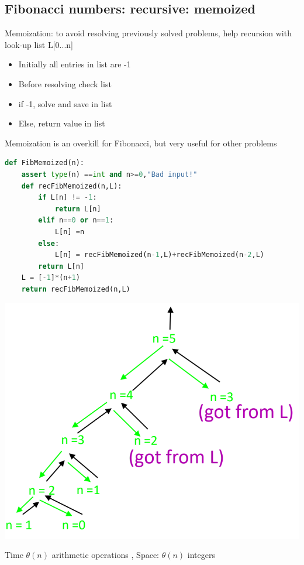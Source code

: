 \documentclass[12pt,oneside]{book}
\begin{document}
\subsection{Fibonacci numbers: recursive: memoized}
Memoization: to avoid resolving previously solved problems, help recursion with look-up list L[0...n]
\begin{itemize}
	\item Initially all entries in list are -1
	\item Before resolving check list
	\item if -1, solve and save in list
	\item Else, return value in list
\end{itemize}
Memoization is an overkill for Fibonacci, but very useful for other problems

\begin{minipage}{0.5\linewidth}
	\begin{lstlisting}[language=python]
def FibMemoized(n):
    assert type(n) ==int and n>=0,"Bad input!"
    def recFibMemoized(n,L):
        if L[n] != -1:
            return L[n]
        elif n==0 or n==1:
            L[n] =n 
        else: 
            L[n] = recFibMemoized(n-1,L)+recFibMemoized(n-2,L)
        return L[n]
    L = [-1]*(n+1)
    return recFibMemoized(n,L)
\end{lstlisting}
\end{minipage}
\begin{minipage}{0.4\linewidth}
	\includegraphics[width=\linewidth]{../pic/python/10}
\end{minipage}
Time $\theta(n)$ arithmetic operations , Space: $\theta(n)$ integers
\end{document}
